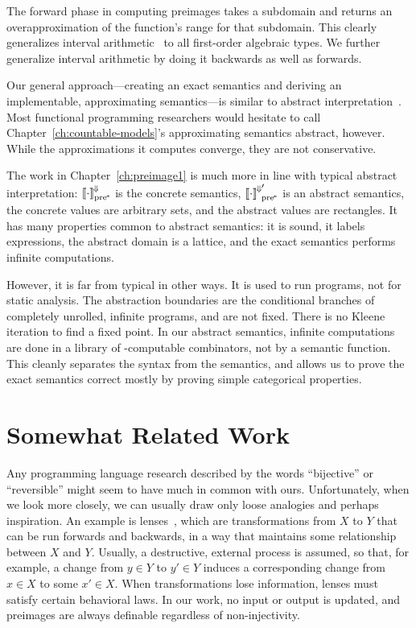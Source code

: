 The forward phase in computing preimages takes a subdomain and returns an overapproximation of the function's range for that subdomain.
This clearly generalizes interval arithmetic~\cite{cit:kearfott-1996eb-interval} to all first-order algebraic types.
We further generalize interval arithmetic by doing it backwards as well as forwards.

Our general approach---creating an exact semantics and deriving an implementable, approximating semantics---is similar to abstract interpretation~\cite{cit:cousot-1977popl-abstract-interpretation}.
Most functional programming researchers would hesitate to call Chapter~\ref{ch:countable-models}'s approximating semantics abstract, however.
While the approximations it computes converge, they are not conservative.

The work in Chapter~\ref{ch:preimage1} is much more in line with typical abstract interpretation: $\left\llbracket{\cdot}\right\rrbracket^{\mspace{-2mu}\Downarrow\mspace{-2mu}}_\mathrm{pre^{\mspace{-2mu}*}}$ is the concrete semantics, ${\left\llbracket{\cdot}\right\rrbracket^{\mspace{-2mu}\Downarrow\mspace{-2mu}}}_\mathrm{pre^{\mspace{-2mu}*}}'$ is an abstract semantics, the concrete values are arbitrary sets, and the abstract values are rectangles.
It has many properties common to abstract semantics: it is sound, it labels expressions, the abstract domain is a lattice, and the exact semantics performs infinite computations.

However, it is far from typical in other ways.
It is used to run programs, not for static analysis.
The abstraction boundaries are the conditional branches of completely unrolled, infinite programs, and are not fixed.
There is no Kleene iteration to find a fixed point.
In our abstract semantics, infinite computations are done in a library of \lzfclang-computable combinators, not by a semantic function.
This cleanly separates the syntax from the semantics, and allows us to prove the exact semantics correct mostly by proving simple categorical properties.


\section{Somewhat Related Work}

Any programming language research described by the words ``bijective'' or ``reversible'' might seem to have much in common with ours.
Unfortunately, when we look more closely, we can usually draw only loose analogies and perhaps inspiration.
An example is lenses~\cite{cit:hofmann-2012popl-edit-lenses}, which are transformations from $X$ to $Y$ that can be run forwards and backwards, in a way that maintains some relationship between $X$ and $Y$.
Usually, a destructive, external process is assumed, so that, for example, a change from $y \in Y$ to $y' \in Y$ induces a corresponding change from $x \in X$ to some $x' \in X$.
When transformations lose information, lenses must satisfy certain behavioral laws.
In our work, no input or output is updated, and preimages are always definable regardless of non-injectivity.

